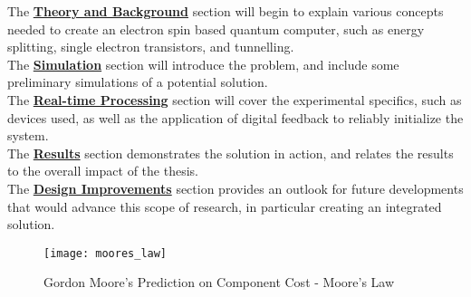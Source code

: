 \noindent The \hyperref[sec::theory]{\textbf{Theory and Background}} section will begin to explain various concepts needed to create an electron spin based quantum computer, such as energy splitting, single electron transistors, and tunnelling. \\
The \hyperref[sec::simulation]{\textbf{Simulation}} section will introduce the problem, and include some preliminary simulations of a potential solution. \\
The \hyperref[sec::real-time]{\textbf{Real-time Processing}} section will cover the experimental specifics, such as devices used, as well as the application of digital feedback to reliably initialize the system. \\
The \hyperref[sec::results]{\textbf{Results}} section demonstrates the solution in action, and relates the results to the overall impact of the thesis. \\
The \hyperref[sec::future]{\textbf{Design Improvements}} section provides an outlook for future developments that would advance this scope of research, in particular creating an integrated solution. \\


\begin{figure}[htbp!]
	\centering
	\texttt{[image: moores\_law]}
	\caption[Moore's Law]{Gordon Moore's Prediction on Component Cost - Moore's Law \cite{moore1965cramming}}
	\label{fig::moores_law}
\end{figure}
